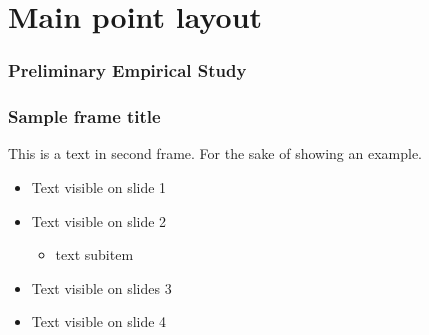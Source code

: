 \documentclass[aspectratio=169,t,xcolor=table]{beamer}
\begin{document}
\section{Main point layout}

\begin{frame}{}
    \frametitle{Preliminary Empirical Study}
\end{frame}



\begin{frame}
    \frametitle{Sample frame title}
    This is a text in second frame. For the sake of showing an example.
    
    \begin{itemize}
        \item<1-> Text visible on slide 1
        \item<2-> Text visible on slide 2
        \begin{itemize}
            \item text subitem
        \end{itemize}
        \item<3> Text visible on slides 3
        \item<4-> Text visible on slide 4
    \end{itemize}
\end{frame}
\end{document}
